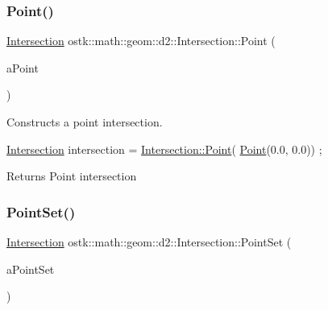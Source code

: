 \subsubsection{\texorpdfstring{Point()}{Point()}}
{\footnotesize\ttfamily \hyperlink{classostk_1_1math_1_1geom_1_1d2_1_1_intersection}{Intersection} ostk\+::math\+::geom\+::d2\+::\+Intersection\+::\+Point (\begin{DoxyParamCaption}\item[{const \hyperlink{classostk_1_1math_1_1geom_1_1d2_1_1objects_1_1_point}{objects\+::\+Point} \&}]{a\+Point }\end{DoxyParamCaption})\hspace{0.3cm}{\ttfamily [static]}}



Constructs a point intersection. 


\begin{DoxyCode}
\hyperlink{classostk_1_1math_1_1geom_1_1d2_1_1_intersection_a52e7ba577832b73a1eb5c95eaddf2834}{Intersection} intersection = \hyperlink{classostk_1_1math_1_1geom_1_1d2_1_1_intersection_a26cc1aec3f2576ec97f0cd54aea9d935}{Intersection::Point}(
      \hyperlink{classostk_1_1math_1_1geom_1_1d2_1_1_intersection_a26cc1aec3f2576ec97f0cd54aea9d935}{Point}(0.0, 0.0)) ;
\end{DoxyCode}


\begin{DoxyReturn}{Returns}
Point intersection 
\end{DoxyReturn}
\mbox{\label{classostk_1_1math_1_1geom_1_1d2_1_1_intersection_a7ae709aa5346528c7024d9b650247fc0}} 
\subsubsection{\texorpdfstring{Point\+Set()}{PointSet()}}
{\footnotesize\ttfamily \hyperlink{classostk_1_1math_1_1geom_1_1d2_1_1_intersection}{Intersection} ostk\+::math\+::geom\+::d2\+::\+Intersection\+::\+Point\+Set (\begin{DoxyParamCaption}\item[{const \hyperlink{classostk_1_1math_1_1geom_1_1d2_1_1objects_1_1_point_set}{objects\+::\+Point\+Set} \&}]{a\+Point\+Set }\end{DoxyParamCaption})\hspace{0.3cm}{\ttfamily [static]}}



